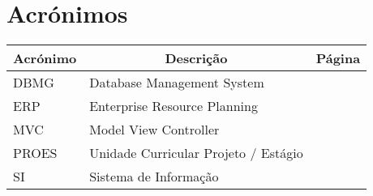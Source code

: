

\chapter[Acrónimos]{Acrónimos}

\begin{center}
\small
\begin{longtable}{lp{3.0in}c}
\toprule \multicolumn{1}{c}{Acrónimo} 
                & \multicolumn{1}{c}{Descrição}
                                & \multicolumn{1}{c}{Página}\\ \midrule\addlinespace[2pt] \endhead

\bottomrule\endfoot

DBMG	& Database Management System			& \pageref{sym:DBMG}\\
ERP		& Enterprise Resource Planning			& \pageref{sym:ERP}\\
MVC		& Model View Controller					& \pageref{sym:MVC}\\
PROES	& Unidade Curricular Projeto / Estágio	& \pageref{sym:PROES}\\
SI		& Sistema de Informação					& \pageref{sym:SI}\\


\end{longtable}

\end{center}

